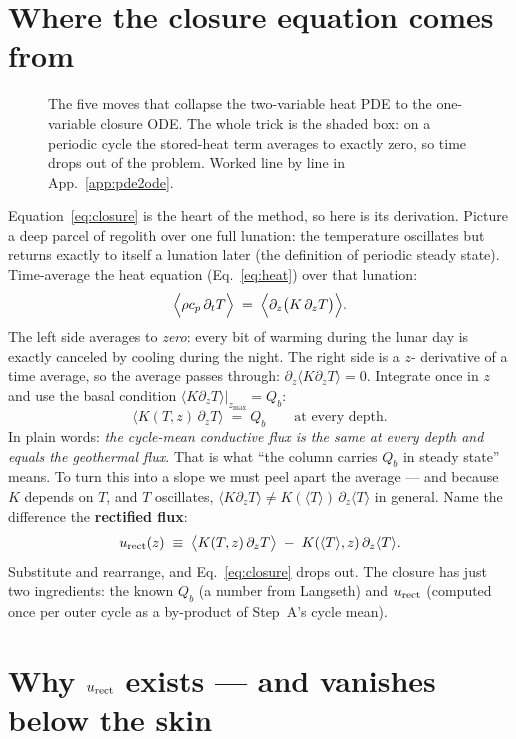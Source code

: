 \documentclass[11pt]{report}
\newcommand{\Tm}{\langle T\rangle}
\begin{document}
\section{Where the closure equation comes from}

\begin{figure}[htbp]\centering

\caption{The five moves that collapse the two-variable heat PDE to the
one-variable closure ODE. The whole trick is the shaded box: on a periodic
cycle the stored-heat term averages to exactly zero, so time drops out of
the problem. Worked line by line in App.~\ref{app:pde2ode}.}
\label{fig:closureflow}
\end{figure}
\label{sec:closure}

Equation~\eqref{eq:closure} is the heart of the method, so here is its
derivation. Picture a deep parcel of regolith over one full lunation: the
temperature oscillates but returns exactly to itself a lunation later (the
definition of periodic steady state). Time-average the heat equation
(Eq.~\eqref{eq:heat}) over that lunation:
\[
\Bigl\langle \rho c_p\,\partial_t T\Bigr\rangle
\;=\;
\Bigl\langle \partial_z\bigl(K\,\partial_z T\bigr)\Bigr\rangle.
\]
The left side averages to \emph{zero}: every bit of warming during the lunar day
is exactly canceled by cooling during the night. The right side is a $z$-
derivative of a time average, so the average passes through: $\partial_z\langle
K\partial_z T\rangle=0$. Integrate once in $z$ and use the basal condition
$\langle K\partial_z T\rangle|_{z_{\max}}=Q_b$:
\begin{equation}
\bigl\langle K(T,z)\,\partial_z T\bigr\rangle \;=\; Q_b
\qquad\text{at every depth.}
\label{eq:fluxsame}
\end{equation}
In plain words: \emph{the cycle-mean conductive flux is the same at every depth
and equals the geothermal flux}. That is what ``the column carries $Q_b$ in
steady state'' means. To turn this into a slope we must peel apart the average ---
and because $K$ depends on $T$, and $T$ oscillates, $\langle K\partial_z
T\rangle \ne K(\Tm)\,\partial_z\Tm$ in general. Name the difference the
\textbf{rectified flux}:
\[
u_{\rm rect}(z) \;\equiv\;
\bigl\langle K(T,z)\,\partial_z T\bigr\rangle \;-\; K(\Tm,z)\,\partial_z\Tm.
\]
Substitute and rearrange, and Eq.~\eqref{eq:closure} drops out. The closure has
just two ingredients: the known $Q_b$ (a number from Langseth) and $u_{\rm rect}$
(computed once per outer cycle as a by-product of Step~A's cycle mean).

\section{Why $u_{\rm rect}$ exists --- and vanishes below the skin}
\end{document}
